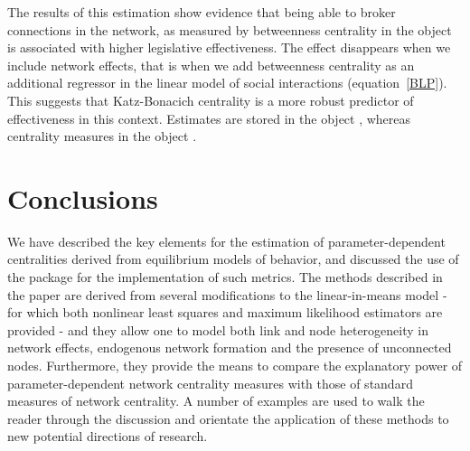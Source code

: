 \documentclass[nojss]{jss}
\begin{document}
The results of this estimation show evidence that being able to broker connections in the network, as measured by betweenness centrality in the object 
is associated with higher legislative effectiveness. The effect disappears when we include network effects, that is when we add betweenness centrality as an additional regressor in the linear model of social interactions (equation~\ref{BLP}). This suggests that Katz-Bonacich centrality is a more robust predictor of effectiveness in this context. Estimates are stored in the object , whereas centrality measures in the object .

\section{Conclusions}

We have described the key elements for the estimation of parameter-dependent centralities derived from equilibrium models of behavior, and discussed the use of the package  for the implementation of such metrics. The methods described in the paper are derived from several modifications to the linear-in-means model - for which both nonlinear least squares
and maximum likelihood estimators are provided - and they allow one to model both link and node heterogeneity in network effects, endogenous network formation and the presence of unconnected nodes. Furthermore, they provide the means to compare the explanatory power of parameter-dependent network centrality measures with those of standard measures of network
centrality. A number of examples are used to walk the reader through the discussion and orientate the application of these methods to new potential directions of research.


\end{document}
